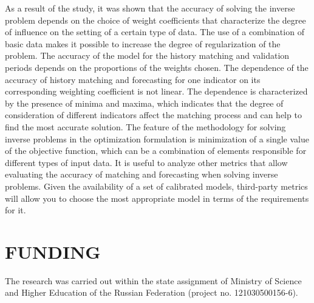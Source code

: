 \documentclass[
11pt,%
tightenlines,%
twoside,%
onecolumn,%
nofloats,%
nobibnotes,%
nofootinbib,%
superscriptaddress,%
noshowpacs,%
centertags]%
{revtex4}
\begin{document}
As a result of the study, it was shown that the accuracy of solving
the inverse problem depends on the choice of weight coefficients
that characterize the degree of influence on the setting of a
certain type of data. The use of a combination of basic data makes
it possible to increase the degree of regularization of the problem.
The accuracy of the model for the history matching and validation
periods depends on the proportions of the weights chosen.
The dependence of the accuracy of history matching and forecasting 
for one indicator on its corresponding weighting coefficient is not linear.
The dependence is characterized by the presence of
minima and maxima, which indicates that the degree of consideration
of different indicators affect the matching process and can help to
find the most accurate solution. The feature of the methodology for solving inverse problems in the optimization formulation is minimization of a single value of the objective function, which can be a combination of elements responsible for different types of input data. It is useful to analyze other metrics that allow evaluating the accuracy of matching and forecasting when solving inverse problems.
Given the availability of a set of calibrated models,
third-party metrics will allow you to choose the most appropriate
model in terms of the requirements for it.

\section{FUNDING}
The research was carried out within the  state assignment of
Ministry of Science and Higher Education of the Russian Federation
(project no. 121030500156-6).
\end{document}

